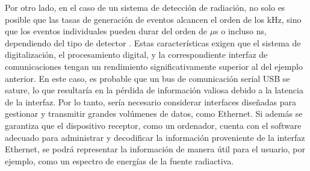 \documentclass[]{book}
\begin{document}
\noindent Por otro lado, en el caso de un sistema de detección de radiación, no solo es posible que las tasas de generación de eventos alcancen el orden de los kHz, sino que los eventos individuales pueden durar del orden de $\mu$s o incluso ns, dependiendo del tipo de detector \cite{knoll2010radiation}. Estas características exigen que el sistema de digitalización, el procesamiento digital, y la correspondiente interfaz de comunicaciones tengan un rendimiento significativamente superior al del ejemplo anterior. En este caso, es probable que un bus de comunicación serial USB se sature, lo que resultaría en la pérdida de información valiosa debido a la latencia de la interfaz. Por lo tanto, sería necesario considerar interfaces diseñadas para gestionar y transmitir grandes volúmenes de datos, como Ethernet. Si además se garantiza que el dispositivo receptor, como un ordenador, cuenta con el software adecuado para administrar y decodificar la información proveniente de la interfaz Ethernet, se podrá representar la información de manera útil para el usuario, por ejemplo, como un espectro de energías de la fuente radiactiva.


 

\end{document}
